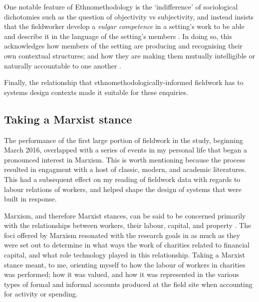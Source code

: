 One notable feature of Ethnomethodology is the `indifference' of sociological dichotomies such as the question of objectivity vs subjectivity, and instead insists that the fieldworker develop a \textit{vulgar competence} in a setting's work to be able and describe it in the language of the setting's members \cite{randall_fieldwork_2007, crabtree_doing_2012}. In doing so, this acknowledges how members of the setting are producing and recognising their own contextual structures; and how they are making them mutually intelligible or naturally accountable to one another \cite{garfinkel_studies_1967, randall_fieldwork_2007}.


Finally, the relationship that ethnomethodologically-informed fieldwork has to systems design contexts made it suitable for these enquiries.


\subsection{Taking a Marxist stance}

The performance of the first large portion of fieldwork in the study, beginning March 2016, overlapped with a series of events in my personal life that began a pronounced interest in Marxism. This is worth mentioning because the process resulted in engagment with a host of classic, modern, and academic literatures. This had a subsequent effect on my reading of fieldwork data with regards to labour relations of workers, and helped shape the design of systems that were built in response.


Marxism, and therefore Marxist stances, can be said to be concerned primarily with the relationships between workers, their labour, capital, and property \cite{singer_marx:_2001, johnson_blackwell_2012}. The foci offered by Marxism resonated with the research goals in as much as they were set out to determine in what ways the work of charities related to financial capital, and what role technology played in this relationship. Taking a Marxist stance meant, to me, orienting myself to how the labour of workers in charities was performed; how it was valued, and how it was represented in the various types of formal and informal accounts produced at the field site when accounting for activity or spending.


